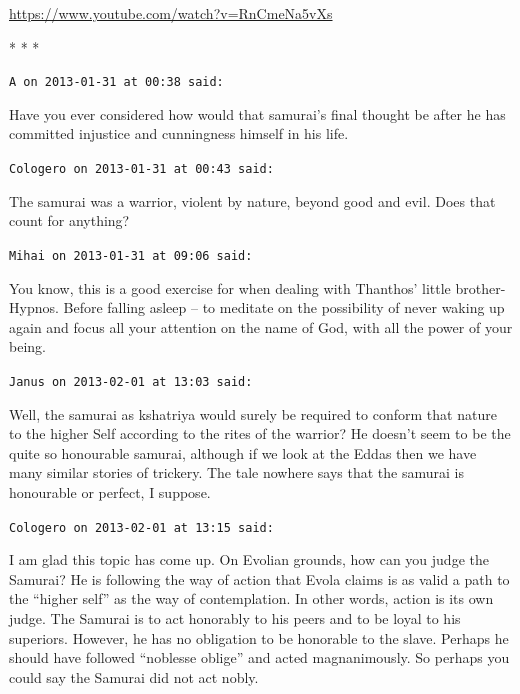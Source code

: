 \url{https://www.youtube.com/watch?v=RnCmeNa5vXs}


\begin{center}* * *\end{center}

\begin{footnotesize}
\begin{sffamily}
\texttt{A on 2013-01-31 at 00:38 said:}

Have you ever considered how would that samurai's final thought be after he has committed injustice and cunningness himself in his life.

\hfill

\texttt{Cologero on 2013-01-31 at 00:43 said:}

The samurai was a warrior, violent by nature, beyond good and evil. Does that count for anything?

\hfill

\texttt{Mihai on 2013-01-31 at 09:06 said:}

You know, this is a good exercise for when dealing with Thanthos' little brother- Hypnos. Before falling asleep -- to meditate on the possibility of never waking up again and focus all your attention on the name of God, with all the power of your being.

\hfill

\texttt{Janus on 2013-02-01 at 13:03 said:}

Well, the samurai as kshatriya would surely be required to conform that nature to the higher Self according to the rites of the warrior? He doesn't seem to be the quite so honourable samurai, although if we look at the Eddas then we have many similar stories of trickery. The tale nowhere says that the samurai is honourable or perfect, I suppose.

\hfill

\texttt{Cologero on 2013-02-01 at 13:15 said:}

I am glad this topic has come up. On Evolian grounds, how can you judge the Samurai? He is following the way of action that Evola claims is as valid a path to the ``higher self'' as the way of contemplation. In other words, action is its own judge. The Samurai is to act honorably to his peers and to be loyal to his superiors. However, he has no obligation to be honorable to the slave. Perhaps he should have followed ``noblesse oblige'' and acted magnanimously. So perhaps you could say the Samurai did not act nobly.


\end{sffamily}
\end{footnotesize}
